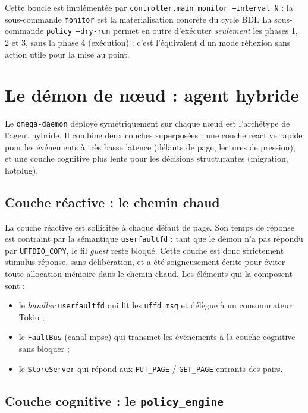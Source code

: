 Cette boucle est implémentée par \texttt{controller.main monitor --interval N} : la sous-commande \texttt{monitor} est la matérialisation concrète du cycle BDI. La sous-commande \texttt{policy --dry-run} permet en outre d'exécuter \emph{seulement} les phases 1, 2 et 3, sans la phase 4 (exécution) : c'est l'équivalent d'un mode \og{}réflexion sans action\fg{} utile pour la mise au point.

\section{Le démon de nœud : agent hybride}
\label{sec:sma-daemon}

Le \texttt{omega-daemon} déployé symétriquement sur chaque nœud est l'archétype de l'agent hybride. Il combine deux couches superposées : une couche réactive rapide pour les événements à très basse latence (défauts de page, lectures de pression), et une couche cognitive plus lente pour les décisions structurantes (migration, hotplug).

\subsection{Couche réactive : le chemin chaud}

La couche réactive est sollicitée à chaque défaut de page. Son temps de réponse est contraint par la sémantique \texttt{userfaultfd} : tant que le démon n'a pas répondu par \texttt{UFFDIO\_COPY}, le fil \emph{guest} reste bloqué. Cette couche est donc strictement stimulus-réponse, sans délibération, et a été soigneusement écrite pour éviter toute allocation mémoire dans le chemin chaud. Les éléments qui la composent sont :

\begin{itemize}[leftmargin=*]
    \item le \emph{handler} \texttt{userfaultfd} qui lit les \texttt{uffd\_msg} et délègue à un consommateur Tokio ;
    \item le \texttt{FaultBus} (canal mpsc) qui transmet les événements à la couche cognitive sans bloquer ;
    \item le \texttt{StoreServer} qui répond aux \texttt{PUT\_PAGE} / \texttt{GET\_PAGE} entrants des pairs.
\end{itemize}

\subsection{Couche cognitive : le \texttt{policy\_engine}}

